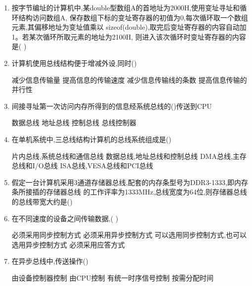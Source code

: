 \documentclass[12pt, a4paper, oneside, UTF8]{ctexbook}
\begin{document}
\begin{enumerate}
    \item 按字节编址的计算机中,某double型数组A的首地址为2000H,使用变址寻址和循环结构访问数组A,
    保存数组下标的变址寄存器的初值为0,每次循环取一个数组元素,其偏移地址为变址值乘以
    sizeof(double),取完后变址寄存器的内容自动加1。若某次循环所取元素的地址为2100H,
    则进入该次循环时变址寄存器的内容是(   )
    \begin{choices}
       
    \end{choices} 

    \item 计算机使用总线结构便于增减外设,同时() 
    \begin{choices}[2]
        \task 减少信息传输量 
        \task 提高信息的传输速度 
        \task 减少信息传输线的条数 
        \task 提高信息传输的并行性 
    \end{choices}

    \item 间接寻址第一次访问内存所得到的信息经系统总线的()传送到CPU 
    \begin{choices}
        \task 数据总线 
        \task 地址总线 
        \task 控制总线 
        \task 总线控制器 
    \end{choices}

    \item 在单机系统中,三总线结构计算机的总线系统组成是() 
    \begin{choices}[1]
        \task 片内总线,系统总线和通信总线
        \task 数据总线,地址总线和控制总线 
        \task DMA总线,主存总线和I/O总线 
        \task ISA总线,VESA总线和PCI总线
    \end{choices} 
    
    \item \bl 假定一台计算机采用3通道存储器总线,配套的内存条型号为DDR3-1333,即内存条所接插的存储器总线
    的工作评率为1333MHz,总线宽度为64位,则存储器总线的总线带宽大约是()

    \item 在不同速度的设备之间传输数据,(  ) 
    \begin{choices}[1]
        \task 必须采用同步控制方式 
        \task 必须采用异步控制方式 
        \task 可以选用同步控制方式,也可以选用异步控制方式 
        \task 必须采用应答方式
    \end{choices}

    \item 在异步总线中,传送操作() 
    \begin{choices}[2]
        \task 由设备控制器控制 
        \task 由CPU控制 
        \task 有统一时序信号控制 
        \task 按需分配时间
    \end{choices}


\end{enumerate}
\end{document}

